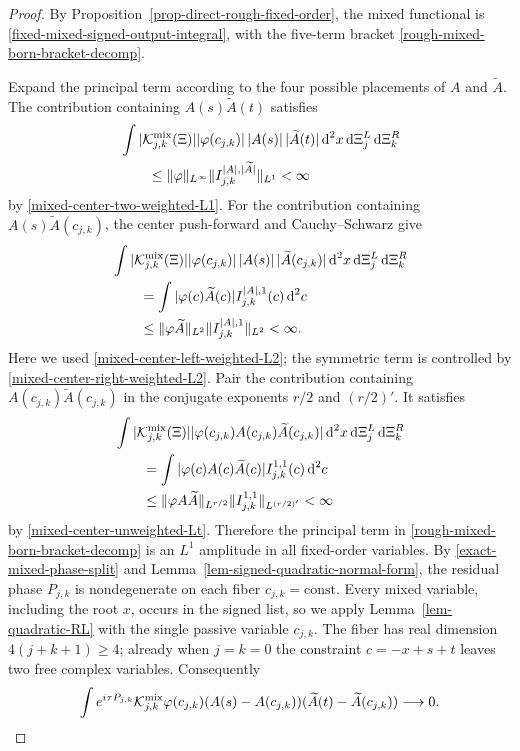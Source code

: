 \documentclass[a4paper,11pt]{article}
\newcommand{\dd}{\,\text{d}}
\theoremstyle{plain}
\theoremstyle{definition}
\theoremstyle{remark}
\begin{document}
\begin{proof}
By Proposition~\ref{prop-direct-rough-fixed-order}, the mixed functional is \eqref{fixed-mixed-signed-output-integral}, with the five-term bracket \eqref{rough-mixed-born-bracket-decomp}.

Expand the principal term according to the four possible placements of $A$ and $\widetilde A$. The contribution containing $A(s)\widetilde A(t)$ satisfies
\begin{align}
 &\int |\mathcal K_{j,k}^{\rm mix}(\Xi)|
 |\varphi(c_{j,k})|\,|A(s)|\,|\widetilde A(t)|
 \dd^2x\dd\Xi_j^L\dd\Xi_k^R
 \notag\\
 &\qquad\leq \|\varphi\|_{L^\infty}
 \|I_{j,k}^{|A|,|\widetilde A|}\|_{L^1}<\infty
 \label{fixed-mixed-terminal-terminal-L1}
\end{align}
by \eqref{mixed-center-two-weighted-L1}.  For the contribution containing $A(s)\widetilde A(c_{j,k})$,
the center push-forward and Cauchy--Schwarz give
\begin{align}
 &\int |\mathcal K_{j,k}^{\rm mix}(\Xi)|
 |\varphi(c_{j,k})|\,|A(s)|\,|\widetilde A(c_{j,k})|
 \dd^2x\dd\Xi_j^L\dd\Xi_k^R
 \notag\\
 &\qquad=
 \int |\varphi(c)\widetilde A(c)|I_{j,k}^{|A|,1}(c)\dd^2c
 \notag\\
 &\qquad\leq
 \|\varphi\widetilde A\|_{L^2}
 \|I_{j,k}^{|A|,1}\|_{L^2}<\infty.
 \label{fixed-mixed-left-terminal-right-center-L1}
\end{align}
Here we used \eqref{mixed-center-left-weighted-L2}; the symmetric term is controlled by \eqref{mixed-center-right-weighted-L2}.  Pair the contribution containing $A(c_{j,k})\widetilde A(c_{j,k})$ in the conjugate exponents
$r/2$ and $(r/2)'$.  It satisfies
\begin{align}
 &\int |\mathcal K_{j,k}^{\rm mix}(\Xi)|
 |\varphi(c_{j,k})A(c_{j,k})\widetilde A(c_{j,k})|
 \dd^2x\dd\Xi_j^L\dd\Xi_k^R
 \notag\\
 &\qquad=
 \int |\varphi(c)A(c)\widetilde A(c)|I_{j,k}^{1,1}(c)\dd^2c
 \notag\\
 &\qquad\leq
 \|\varphi A\widetilde A\|_{L^{r/2}}
 \|I_{j,k}^{1,1}\|_{L^{(r/2)'}}<\infty
 \label{fixed-mixed-center-center-L1}
\end{align}
by \eqref{mixed-center-unweighted-Lt}.  Therefore the principal term in
\eqref{rough-mixed-born-bracket-decomp} is an $L^1$ amplitude in all fixed-order
variables.  By \eqref{exact-mixed-phase-split} and
Lemma~\ref{lem-signed-quadratic-normal-form}, the residual phase
$P_{j,k}$ is nondegenerate on each fiber $c_{j,k}=\mathrm{const}$.  Every
mixed variable, including the root $x$, occurs in the signed list, so we apply
Lemma~\ref{lem-quadratic-RL} with the single passive variable $c_{j,k}$.  The
fiber has real dimension $4(j+k+1)\ge4$; already when $j=k=0$ the constraint
$c=-x+s+t$ leaves two free complex variables.  Consequently
\begin{equation}\label{fixed-mixed-principal-decay}
 \int e^{i\tau P_{j,k}}\mathcal K_{j,k}^{\rm mix}
 \varphi(c_{j,k})(A(s)-A(c_{j,k}))
 (\widetilde A(t)-\widetilde A(c_{j,k}))
 \longrightarrow0.
\end{equation}


\end{proof}
\end{document}
